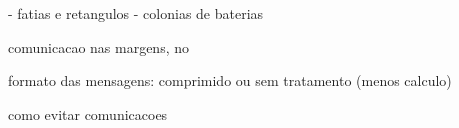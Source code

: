 - fatias e retangulos
- colonias de baterias

comunicacao  nas margens, no 

formato das mensagens: comprimido ou sem tratamento (menos calculo)

como evitar comunicacoes